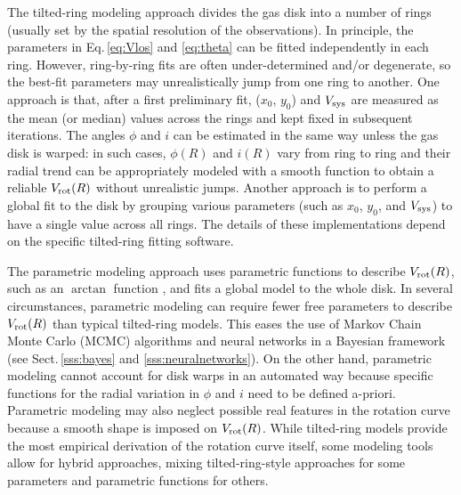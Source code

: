 \documentclass[a4paper,11pt]{article}
\begin{document}
The tilted-ring modeling approach \citep{Rogstad1974, Begeman1989} divides the gas disk into a number of rings (usually set by the spatial resolution of the observations). In principle, the parameters in Eq.\,\ref{eq:Vlos} and \ref{eq:theta} can be fitted independently in each ring. However, ring-by-ring fits are often under-determined and/or degenerate, so the best-fit parameters may unrealistically jump from one ring to another. One approach is that,  after a first preliminary fit, ($x_0$, $y_0$) and $V_{\rm sys}$ are measured as the mean (or median) values across the rings and kept fixed in subsequent iterations. The angles $\phi$ and $i$ can be estimated in the same way unless the gas disk is warped: in such cases, $\phi(R)$ and $i(R)$ vary from ring to ring and their radial trend can be appropriately modeled with a smooth function to obtain a reliable $V_{\rm rot}(R)$ without unrealistic jumps. Another approach is to perform a global fit to the disk by grouping various parameters (such as $x_0$, $y_0$, and $V_{\rm sys}$) to have a single value across all rings. The details of these implementations depend on the specific tilted-ring fitting software.

The parametric modeling approach uses parametric functions to describe $V_{\rm rot}(R)$, such as an $\arctan$ function \citep{Epinat2010}, and fits a global model to the whole disk. In several circumstances, parametric modeling can require fewer free parameters to describe $V_{\rm rot}(R)$ than typical tilted-ring models. This eases the use of Markov Chain Monte Carlo (MCMC) algorithms \citep[e.g.,][]{Bouche2015, TD17, Lee2025} and neural networks \citep{Dawson2021} in a Bayesian framework (see Sect.\,\ref{sss:bayes} and \ref{sss:neuralnetworks}). 
On the other hand, parametric modeling cannot account for disk warps in an automated way because specific functions for the radial variation in $\phi$ and $i$ need to be defined a-priori. Parametric modeling may also neglect possible real features in the rotation curve because a smooth shape is imposed on $V_{\rm rot}(R)$. While tilted-ring models provide the most empirical derivation of the rotation curve itself, some modeling tools allow for hybrid approaches, mixing tilted-ring-style approaches for some parameters and parametric functions for others.
\end{document}
